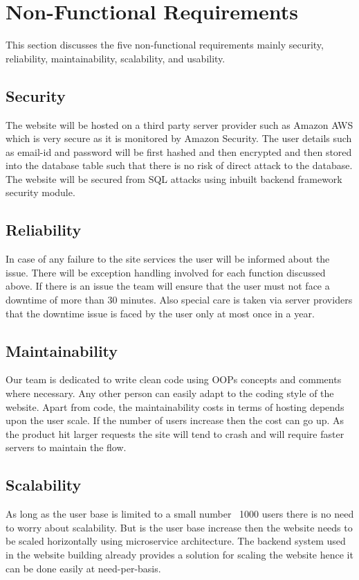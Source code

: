 \documentclass[12pt]{report}
\begin{document}
\section{Non-Functional Requirements}
This section discusses the five non-functional requirements mainly security, reliability, maintainability, scalability, and usability.

\subsection{Security}
The website will be hosted on a third party server provider such as Amazon AWS which is very secure as it is monitored by Amazon Security. The user details such as email-id and password will be first hashed and then encrypted and then stored into the database table such that there is no risk of direct attack to the database. The website will be secured from SQL attacks using inbuilt backend framework security module.

\subsection{Reliability}
In case of any failure to the site services the user will be informed about the issue. There will be exception handling involved for each function discussed above. If there is an issue the team will ensure that the user must not face a downtime of more than 30 minutes. Also special care is taken via server providers that the downtime issue is faced by the user only at most once in a year.

\subsection{Maintainability}
Our team is dedicated to write clean code using OOPs concepts and comments where necessary. Any other person can easily adapt to the coding style of the website. Apart from code, the maintainability costs in terms of hosting depends upon the user scale. If the number of users increase then the cost can go up. As the product hit larger requests the site will tend to crash and will require faster servers to maintain the flow. 

\subsection{Scalability}
As long as the user base is limited to a small number ~1000 users there is no need to worry about scalability. But is the user base increase then the website needs to be scaled horizontally using microservice architecture. The backend system used in the website building already provides a solution for scaling the website hence it can be done easily at need-per-basis.
\end{document}
